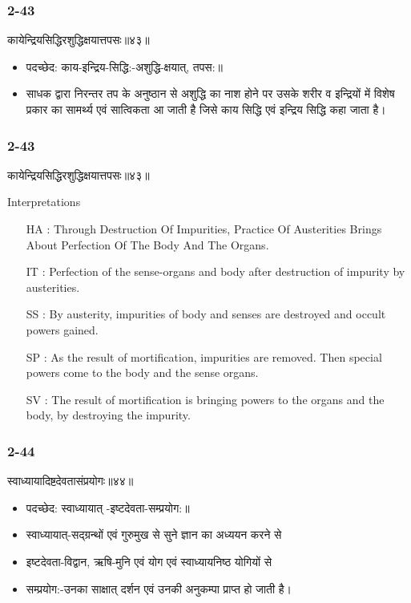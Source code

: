\begin{frame}[fragile]\frametitle{2-43}
\begin{sanskrit}
कायेन्द्रियसिद्धिरशुद्धिक्षयात्तपसः॥४३॥
\end{sanskrit}

\begin{itemize}
\item पदच्छेद: काय-इन्द्रिय-सिद्धि:-अशुद्धि-क्षयात्, तपस:॥
\item साधक द्वारा निरन्तर तप के अनुष्ठान से अशुद्धि का नाश होने पर उसके शरीर व इन्द्रियों में विशेष प्रकार का सामर्थ्य एवं सात्विकता आ जाती है जिसे काय सिद्धि एवं इन्द्रिय सिद्धि कहा जाता है।
\end{itemize}	
	
\end{frame}


\begin{frame}[fragile]\frametitle{2-43}
\begin{sanskrit}
कायेन्द्रियसिद्धिरशुद्धिक्षयात्तपसः॥४३॥
\end{sanskrit}

Interpretations
\begin{itemize}
\item [HA]: Through Destruction Of Impurities, Practice Of Austerities Brings About Perfection Of The Body And The Organs.
\item [IT]: Perfection of the sense-organs and body after destruction of impurity by austerities.
\item [SS]: By austerity, impurities of body and senses are destroyed and occult powers gained.
\item [SP]: As the result of mortification, impurities are removed. Then special powers come to the body and the sense organs.
\item [SV]: The result of mortification is bringing powers to the organs and the body, by destroying the impurity. 
\end{itemize}
		
\end{frame}

\begin{frame}[fragile]\frametitle{2-44}
\begin{sanskrit}
स्वाध्यायादिष्टदेवतासंप्रयोगः॥४४॥
\end{sanskrit}

\begin{itemize}
\item पदच्छेद: स्वाध्यायात् -इष्टदेवता-सम्प्रयोग:॥
\item स्वाध्यायात्-सद्ग्रन्थों एवं गुरुमुख से सुने ज्ञान का अध्ययन करने से
\item इष्टदेवता-विद्वान, ऋषि-मुनि एवं योग एवं स्वाध्यायनिष्ठ योगियों से
\item सम्प्रयोग:-उनका साक्षात् दर्शन एवं उनकी अनुकम्पा प्राप्त हो जाती है।
\end{itemize}	
	
\end{frame}


